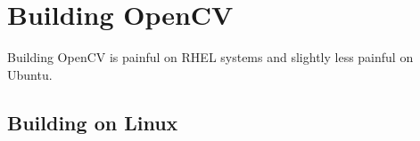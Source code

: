 \documentclass[12pt]{report}
\begin{document}
\section*{Building OpenCV}

Building OpenCV is painful on RHEL systems and slightly less painful on Ubuntu.

\subsection*{Building on Linux}
\end{document}
